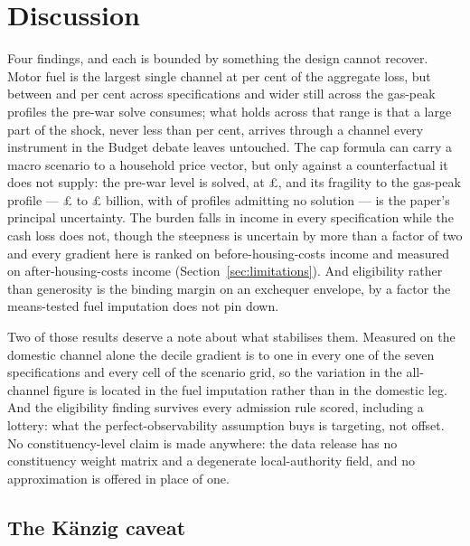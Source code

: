 \section{Discussion}
\label{sec:discussion}

Four findings, and each is bounded by something the design cannot recover. Motor fuel is the largest single channel at \genMotorFuelShareOfLoss{} per cent of the aggregate loss, but between \genSpecFuelShareMinPct{} and \genSpecFuelShareMaxPct{} per cent across specifications and wider still across the gas-peak profiles the pre-war solve consumes; what holds across that range is that a large part of the shock, never less than \genSpecFuelShareMinPct{} per cent, arrives through a channel every instrument in the Budget debate leaves untouched. The cap formula can carry a macro scenario to a household price vector, but only against a counterfactual it does not supply: the pre-war level is solved, at \pounds \genCapBaselineLevel{}, and its fragility to the gas-peak profile --- \pounds \genGasProfileAggMinBn{} to \pounds \genGasProfileAggMaxBn{} billion, with \genGasProfileNonIdentifiedCount{} of \genGasProfileCellCount{} profiles admitting no solution --- is the paper's principal uncertainty. The burden falls in income in every specification while the cash loss does not, though the steepness is uncertain by more than a factor of two and every gradient here is ranked on before-housing-costs income and measured on after-housing-costs income (Section~\ref{sec:limitations}). And eligibility rather than generosity is the binding margin on an exchequer envelope, by a factor the means-tested fuel imputation does not pin down.

Two of those results deserve a note about what stabilises them. Measured on the domestic channel alone the decile gradient is \genDomesticOnlyDecileRatioPct{} to one in every one of the seven specifications and every cell of the scenario grid, so the variation in the all-channel figure is located in the fuel imputation rather than in the domestic leg. And the eligibility finding survives every admission rule scored, including a lottery: what the perfect-observability assumption buys is targeting, not offset. No constituency-level claim is made anywhere: the data release has no constituency weight matrix and a degenerate local-authority field, and no approximation is offered in place of one.

\subsection{The K\"anzig caveat}

